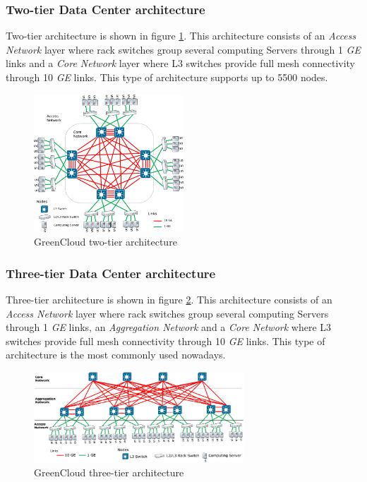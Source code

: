\subsubsection{Two-tier Data Center architecture}
Two-tier architecture is shown in figure \ref{fig:greencloud_twotier}. This architecture consists of an \emph{Access Network} layer where rack switches group several computing Servers through 1 \emph{GE} links and a \emph{Core Network} layer where L3 switches provide full mesh connectivity through 10 \emph{GE} links. This type of architecture supports up to 5500 nodes.
\begin{figure}[h]
    \centering
    \includegraphics[width=0.5\textwidth]{chapters/images/greencloud_twotier.png}
    \caption{GreenCloud two-tier architecture}
    \label{fig:greencloud_twotier}
\end{figure}

\subsubsection{Three-tier Data Center architecture}
Three-tier architecture is shown in figure \ref{fig:greencloud_threetier}. This architecture consists of an \emph{Access Network} layer where rack switches group several computing Servers through 1 \emph{GE} links, an \emph{Aggregation Network} and a \emph{Core Network} where L3 switches provide full mesh connectivity through 10 \emph{GE} links. This type of architecture is the most commonly used nowadays.

\begin{figure}[h]
    \centering
    \includegraphics[width=0.7\textwidth]{chapters/images/greencloud_threetier.png}
    \caption{GreenCloud three-tier architecture}
    \label{fig:greencloud_threetier}
\end{figure}


